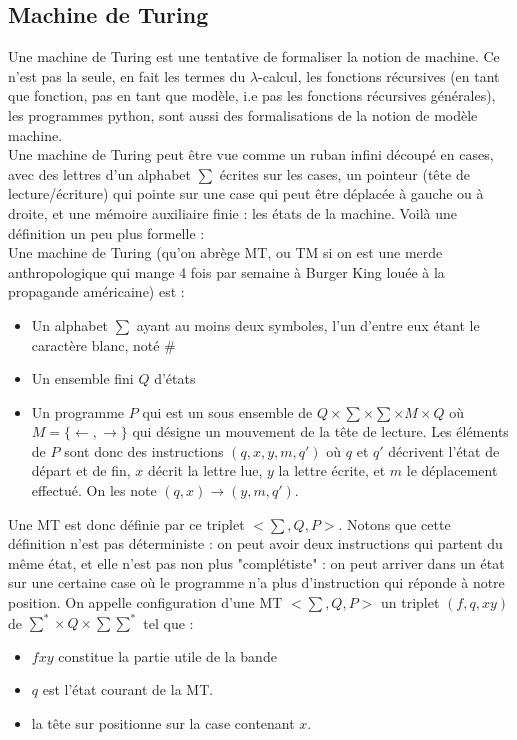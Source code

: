 \documentclass{article}
\begin{document}
\subsection{Machine de Turing}

Une machine de Turing est une tentative de formaliser la notion de machine. Ce n'est pas la seule, en fait les termes du $\lambda$-calcul, les fonctions récursives (en tant que fonction, pas en tant que modèle, i.e pas les fonctions récursives générales), les programmes python, sont aussi des formalisations de la notion de modèle machine. \\ 
Une machine de Turing peut être vue comme un ruban infini découpé en cases, avec des lettres d'un alphabet $\sum$ écrites sur les cases, un pointeur (tête de lecture/écriture) qui pointe sur une case qui peut être déplacée à gauche ou à droite, et une mémoire auxiliaire finie : les états de la machine. Voilà une définition un peu plus formelle : \\
Une machine de Turing (qu'on abrège MT, ou TM si on est une merde anthropologique qui mange 4 fois par semaine à Burger King louée à la propagande américaine) est : 
\begin{itemize}
    \item Un alphabet $\sum$ ayant au moins deux symboles, l'un d'entre eux étant le caractère blanc, noté $\#$
    \item Un ensemble fini $Q$ d'états
    \item Un programme $P$ qui est un sous ensemble de $Q \times \sum \times \sum \times M \times Q$ où $M = \{ \leftarrow, \rightarrow\}$ qui désigne un mouvement de la tête de lecture. Les éléments de $P$ sont donc des instructions $(q,x,y,m,q')$ où $q$ et $q'$ décrivent l'état de départ et de fin, $x$ décrit la lettre lue, $y$ la lettre écrite, et $m$ le déplacement effectué. On les note $(q,x) \rightarrow (y,m,q')$.
\end{itemize}
Une MT est donc définie par ce triplet $<\sum, Q, P >$. Notons que cette définition n'est pas déterministe : on peut avoir deux instructions qui partent du même état, et elle n'est pas non plus "complétiste" : on peut arriver dans un état sur une certaine case où le programme n'a plus d'instruction qui réponde à notre position. On appelle configuration d'une MT $<\sum, Q, P >$ un triplet $(f,q,xy)$ de  $\sum^* \times Q \times \sum \sum^*$ tel que :
\begin{itemize}
    \item $fxy$ constitue la partie utile de la bande
    \item $q$ est l'état courant de la MT.
    \item la tête sur positionne sur la case contenant $x$.
\end{itemize}
\end{document}
